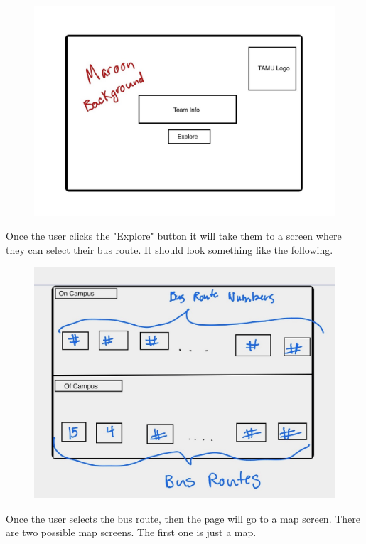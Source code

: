 \documentclass[12pt]{report}
\begin{document}
	 \begin{figure}[h]
	 \includegraphics[scale=0.30]{Home}
	 \centering
     \end{figure}
 
 	\newpage
	
	Once the user clicks the "Explore" button it will take them to a screen where they can select their bus route. It should look something like the following.\\
	
	\begin{figure}[h]
		\includegraphics[scale=0.20]{BusRoutes}
		\centering
	\end{figure}
	
	Once the user selects the bus route, then the page will go to a map screen. There are two possible map screens. The first one is just a map.\\
	
\end{document}

